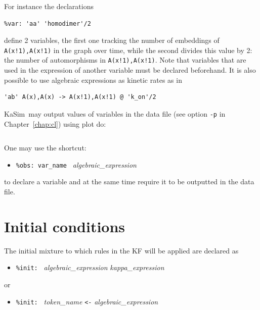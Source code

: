 \documentclass[11pt]{book}
\def\KaSim{\textsf{KaSim}}
\def\ttt#1{\texttt{#1}}
\def\noi{\noindent}
\def\ITE#1{\begin{itemize}#1\end{itemize}}
\begin{document}
\noi For instance the declarations
\begin{lstlisting}[language=kappa]
%var: 'homodimer' |A(x!1),A(x!1)|
%var: 'aa' 'homodimer'/2
\end{lstlisting}
define 2 variables, the first one tracking the number of embeddings of \ttt{A(x!1),A(x!1)} in the graph over time, while the second divides this value by 2: the number of automorphisms in \ttt{A(x!1),A(x!1)}. Note that variables that are used in the expression of another variable must be declared beforehand.
\vskip 0.25cm
\noi It is also possible to use algebraic expressions as kinetic rates as in
\begin{lstlisting}[language=kappa]
%var: 'k_on' 1.0E-6 # per molecule per second
'ab' A(x),A(x) -> A(x!1),A(x!1) @ 'k_on'/2
\end{lstlisting}
\KaSim~may output values of variables in the data file (see option \ttt{-p} in Chapter~\ref{chap:cl}) using plot do:
\begin{lstlisting}[language=kappa]
%plot: 'var_name'
\end{lstlisting}
One may use the shortcut:
\ITE{
\item[] \ttt{\%obs: {\textquotesingle}var\_name{\textquotesingle} } \textit{algebraic\_expression}}
to declare a variable and at the same time require it to be outputted in the data file.

\section{Initial conditions}\label{sec:init}

The initial mixture to which rules in the KF will be applied are declared as
\ITE{
\item[] \ttt{\%init: } \textit{algebraic\_expression} \textit{kappa\_expression}
}
or
\ITE{
\item[] \ttt{\%init: }  \textit{token\_name} \ttt{<-} \textit{algebraic\_expression}
}
\end{document}
